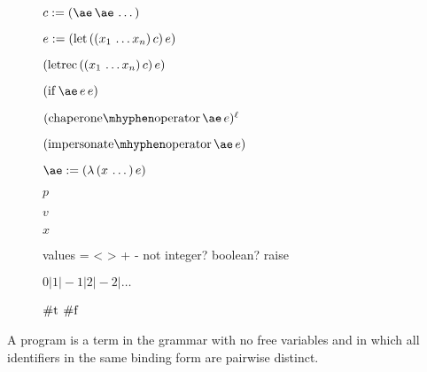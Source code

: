 \documentclass{sigplanconf}
\begin{document}
\begin{figure}
\label{fig:syntax}
$c:=\appe{\ae}{\ae\,\dots}$

$e:=(\mathrm{let}\,((x_1\,\dots x_n)\,c)\,e)$

$(\mathrm{letrec}\,((x_1\,\dots x_n)\,c)\,e)$

$\ife{\ae}{e}{e}$

$\chae{\ae}{e}$

$\impe{\ae}{e}$

$\ae:=\lame{x\,\dots}{e}$

$p$

$v$

$x$

values = < > + - not integer? boolean? raise

$0|1|-1|2|-2|\dots$

$\mathrm{\#t}$
$\mathrm{\#f}$
\end{figure}

A program is a term in the grammar with no free variables and in which all identifiers in the same binding form are pairwise distinct.







\end{document}

